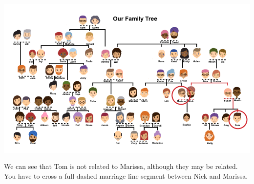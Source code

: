 \documentclass{ximera}
\begin{document}
\begin{example}
\quad \\

\begin{image}
\includegraphics{pics/Marissa_Tom.png}
\end{image}

We can see that Tom is not related to Marissa, although they may be related.  You have to cross a full dashed marriage line segment between Nick and Marissa.

\end{example}
\end{document}
